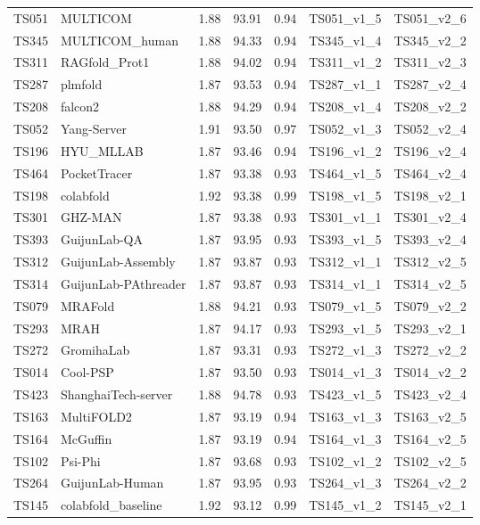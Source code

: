 \begin{longtable}{lllllll}
TS051 & MULTICOM & 1.88 & 93.91 & 0.94 & TS051\_v1\_5 & TS051\_v2\_6 \\ 
TS345 & MULTICOM\_human & 1.88 & 94.33 & 0.94 & TS345\_v1\_4 & TS345\_v2\_2 \\ 
TS311 & RAGfold\_Prot1 & 1.88 & 94.02 & 0.94 & TS311\_v1\_2 & TS311\_v2\_3 \\ 
TS287 & plmfold & 1.87 & 93.53 & 0.94 & TS287\_v1\_1 & TS287\_v2\_4 \\ 
TS208 & falcon2 & 1.88 & 94.29 & 0.94 & TS208\_v1\_4 & TS208\_v2\_2 \\ 
TS052 & Yang-Server & 1.91 & 93.50 & 0.97 & TS052\_v1\_3 & TS052\_v2\_4 \\ 
TS196 & HYU\_MLLAB & 1.87 & 93.46 & 0.94 & TS196\_v1\_2 & TS196\_v2\_4 \\ 
TS464 & PocketTracer & 1.87 & 93.38 & 0.93 & TS464\_v1\_5 & TS464\_v2\_4 \\ 
TS198 & colabfold & 1.92 & 93.38 & 0.99 & TS198\_v1\_5 & TS198\_v2\_1 \\ 
TS301 & GHZ-MAN & 1.87 & 93.38 & 0.93 & TS301\_v1\_1 & TS301\_v2\_4 \\ 
TS393 & GuijunLab-QA & 1.87 & 93.95 & 0.93 & TS393\_v1\_5 & TS393\_v2\_4 \\ 
TS312 & GuijunLab-Assembly & 1.87 & 93.87 & 0.93 & TS312\_v1\_1 & TS312\_v2\_5 \\ 
TS314 & GuijunLab-PAthreader & 1.87 & 93.87 & 0.93 & TS314\_v1\_1 & TS314\_v2\_5 \\ 
TS079 & MRAFold & 1.88 & 94.21 & 0.93 & TS079\_v1\_5 & TS079\_v2\_2 \\ 
TS293 & MRAH & 1.87 & 94.17 & 0.93 & TS293\_v1\_5 & TS293\_v2\_1 \\ 
TS272 & GromihaLab & 1.87 & 93.31 & 0.93 & TS272\_v1\_3 & TS272\_v2\_2 \\ 
TS014 & Cool-PSP & 1.87 & 93.50 & 0.93 & TS014\_v1\_3 & TS014\_v2\_2 \\ 
TS423 & ShanghaiTech-server & 1.88 & 94.78 & 0.93 & TS423\_v1\_5 & TS423\_v2\_4 \\ 
TS163 & MultiFOLD2 & 1.87 & 93.19 & 0.94 & TS163\_v1\_3 & TS163\_v2\_5 \\ 
TS164 & McGuffin & 1.87 & 93.19 & 0.94 & TS164\_v1\_3 & TS164\_v2\_5 \\ 
TS102 & Psi-Phi & 1.87 & 93.68 & 0.93 & TS102\_v1\_2 & TS102\_v2\_5 \\ 
TS264 & GuijunLab-Human & 1.87 & 93.95 & 0.93 & TS264\_v1\_3 & TS264\_v2\_2 \\ 
TS145 & colabfold\_baseline & 1.92 & 93.12 & 0.99 & TS145\_v1\_2 & TS145\_v2\_1 \\ 

\end{longtable}
